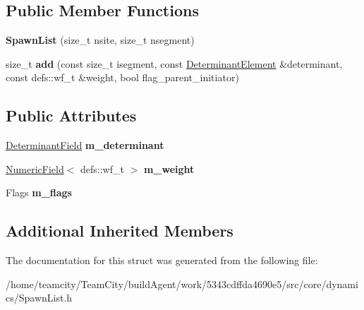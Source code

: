 \subsection*{Public Member Functions}
\begin{DoxyCompactItemize}
\item 
{\bfseries Spawn\+List} (size\+\_\+t nsite, size\+\_\+t nsegment)\hypertarget{structSpawnList_a08e6bb3de513d717a5b1708c41ec8b27}{}\label{structSpawnList_a08e6bb3de513d717a5b1708c41ec8b27}

\item 
size\+\_\+t {\bfseries add} (const size\+\_\+t isegment, const \hyperlink{classDeterminantElement}{Determinant\+Element} \&determinant, const defs\+::wf\+\_\+t \&weight, bool flag\+\_\+parent\+\_\+initiator)\hypertarget{structSpawnList_ac2cc472faaa9e061d5113c748b134d63}{}\label{structSpawnList_ac2cc472faaa9e061d5113c748b134d63}

\end{DoxyCompactItemize}
\subsection*{Public Attributes}
\begin{DoxyCompactItemize}
\item 
\hyperlink{classDeterminantField}{Determinant\+Field} {\bfseries m\+\_\+determinant}\hypertarget{structSpawnList_a5274f5e4867bb8017d9dab9ec57aaf13}{}\label{structSpawnList_a5274f5e4867bb8017d9dab9ec57aaf13}

\item 
\hyperlink{classNumericField}{Numeric\+Field}$<$ defs\+::wf\+\_\+t $>$ {\bfseries m\+\_\+weight}\hypertarget{structSpawnList_a7fc6a9d47e7440aa0369131e7682d9e2}{}\label{structSpawnList_a7fc6a9d47e7440aa0369131e7682d9e2}

\item 
Flags {\bfseries m\+\_\+flags}\hypertarget{structSpawnList_af285fbe90cb99c8ffbb2c9b1bd3fe25a}{}\label{structSpawnList_af285fbe90cb99c8ffbb2c9b1bd3fe25a}

\end{DoxyCompactItemize}
\subsection*{Additional Inherited Members}


The documentation for this struct was generated from the following file\+:\begin{DoxyCompactItemize}
\item 
/home/teamcity/\+Team\+City/build\+Agent/work/5343cdffda4690e5/src/core/dynamics/Spawn\+List.\+h\end{DoxyCompactItemize}
